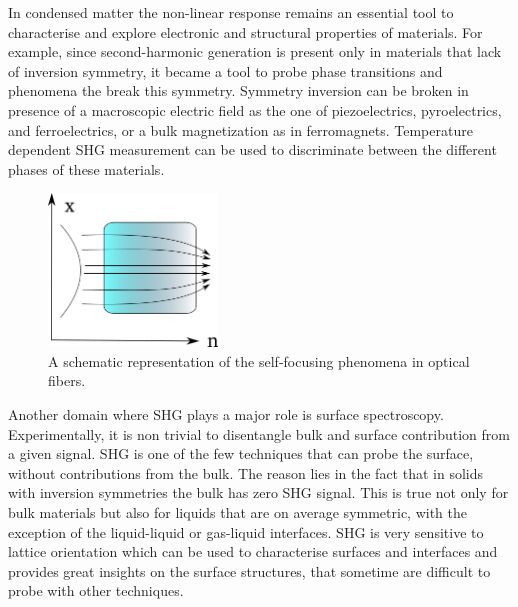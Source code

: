 In condensed matter the non-linear response remains an essential tool to characterise and explore electronic and structural properties of materials. 
For example, since second-harmonic generation is present only in materials that lack of inversion symmetry, it became a tool to probe phase transitions and phenomena the break this symmetry. Symmetry inversion can be broken in presence of a macroscopic electric field as the one of piezoelectrics, pyroelectrics, and ferroelectrics, or a bulk magnetization as in ferromagnets. Temperature dependent SHG measurement can be used to discriminate between the different phases of these materials. %
\begin{figure}
 \vspace{-0.8cm}
\begin{center}
\includegraphics[width=0.4\textwidth]{Figures/selffocus}
\end{center}
\vspace{-0.5cm}
\caption{A schematic representation of the self-focusing phenomena in optical fibers. \label{selffocusing}}
\end{figure}           

Another domain where SHG plays a major role is surface spectroscopy. Experimentally, it is non trivial to disentangle bulk and surface contribution from a given signal. SHG is one of the few techniques that can probe the surface, without contributions from the bulk. The reason lies in the fact that in solids with inversion symmetries the bulk has zero SHG signal. This is true not only for bulk materials but also for liquids that are on average symmetric, with the exception of the liquid-liquid or gas-liquid interfaces. SHG is very sensitive to lattice orientation which can be used to characterise surfaces and interfaces and provides great insights on the surface structures, that sometime are difficult to probe with other techniques.\cite{eisenthal1996liquid}\\

